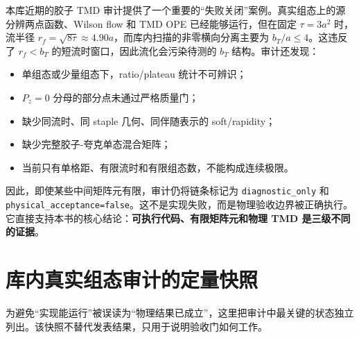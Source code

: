 \documentclass[UTF8,12pt,a4paper,twoside,openany]{ctexbook}
\begin{document}
本库近期的胶子 TMD 审计提供了一个重要的“失败关闭”案例。真实组态上的源分辨两点函数、Wilson flow 和 TMD OPE 已经能够运行，但在固定 \(\tau=3a^2\) 时，流半径 \(r_f=\sqrt{8\tau}\approx4.90a\)，而库内扫描的非零横向分离主要为 \(b_T/a\le4\)。这违反了 \(r_f<b_T\) 的短流时窗口，因此流化会污染待测的 \(b_T\) 结构。审计还发现：
\begin{itemize}
  \item 单组态或少量组态下，ratio/plateau 统计不可辨识；
  \item \(P_z=0\) 分母的部分点未通过严格质量门；
  \item 缺少同流时、同 staple 几何、同伴随表示的 soft/rapidity；
  \item 缺少完整胶子-夸克单态混合矩阵；
  \item 当前只有单格距、有限流时和有限组态数，不能构成连续极限。
\end{itemize}
因此，即使某些中间矩阵元有限，审计仍将链条标记为 \texttt{diagnostic\_only} 和 \texttt{physical\_acceptance=false}。这不是实现失败，而是物理验收边界被正确执行。它直接支持本书的核心结论：\textbf{可执行代码、有限矩阵元和物理 TMD 是三级不同的证据}。

\section{库内真实组态审计的定量快照}

为避免“实现能运行”被误读为“物理结果已成立”，这里把审计中最关键的状态独立列出。该快照不替代发表结果，只用于说明验收门如何工作。
\end{document}
